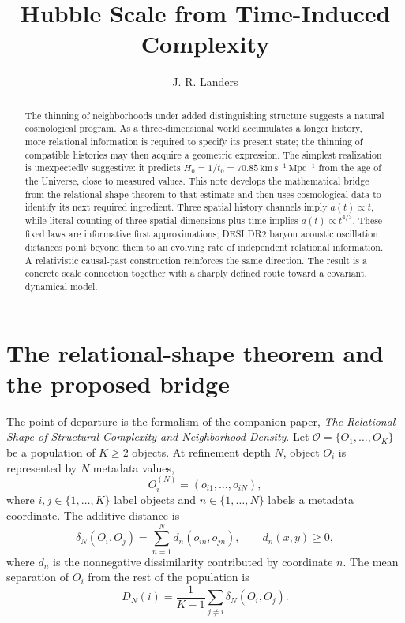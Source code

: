 \documentclass[10pt]{article}
\title{\vspace{-2.3em}\textbf{Hubble Scale from Time-Induced Complexity}}
\author{J. R. Landers}
\date{}
\begin{document}
\maketitle
\vspace{-1.25em}

\begin{abstract}
The thinning of neighborhoods under added distinguishing structure suggests a
natural cosmological program.  As a three-dimensional world accumulates a
longer history, more relational information is required to specify its present
state; the thinning of compatible histories may then acquire a geometric
expression.  The simplest realization is unexpectedly suggestive: it predicts
$H_0=1/t_0=70.85\,\mathrm{km\,s^{-1}\,Mpc^{-1}}$ from the age of the Universe,
close to measured values.  This note develops the mathematical bridge from the
relational-shape theorem to that estimate and then uses cosmological data to
identify its next required ingredient.  Three spatial history channels imply
$a(t)\propto t$, while literal counting of three spatial dimensions plus time
implies $a(t)\propto t^{4/3}$.  These fixed laws are informative first
approximations; DESI DR2 baryon acoustic oscillation distances point beyond
them to an evolving rate of independent relational information.
A relativistic causal-past construction reinforces the same direction.  The
result is a concrete scale connection together with a sharply defined route
toward a covariant, dynamical model.
\end{abstract}

\section*{The relational-shape theorem and the proposed bridge}

The point of departure is the formalism of the companion paper, \emph{The
Relational Shape of Structural Complexity and Neighborhood Density}.  Let
\(
\mathcal O=\{O_1,\ldots,O_K\}
\)
be a population of $K\geq2$ objects.  At refinement depth $N$, object $O_i$ is
represented by $N$ metadata values,
\[
O_i^{(N)}=(o_{i1},\ldots,o_{iN}),
\]
where $i,j\in\{1,\ldots,K\}$ label objects and $n\in\{1,\ldots,N\}$ labels a
metadata coordinate.  The additive distance is
\begin{equation}
\delta_N(O_i,O_j)=\sum_{n=1}^{N}d_n(o_{in},o_{jn}),
\qquad d_n(x,y)\geq0,
\label{eq:additive-distance}
\end{equation}
where $d_n$ is the nonnegative dissimilarity contributed by coordinate $n$.
The mean separation of $O_i$ from the rest of the population is
\begin{equation}
D_N(i)=\frac{1}{K-1}\sum_{j\ne i}\delta_N(O_i,O_j).
\label{eq:mean-distance}
\end{equation}
\end{document}
